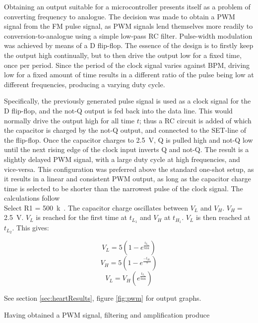 Obtaining an output suitable for a microcontroller presents itself as a problem of converting frequency to analogue. The decision was made to obtain a PWM signal from the FM pulse signal, as PWM signals lend themselves more readily to conversion-to-analogue using a simple low-pass RC filter. Pulse-width modulation was achieved by means of a D flip-flop. The essence of the design is to firstly keep the output high continually, but to then drive the output low for a fixed time, once per period. Since the period of the clock signal varies against BPM, driving low for a fixed amount of time results in a different ratio of the pulse being low at different frequencies, producing a varying duty cycle.

Specifically, the previously generated pulse signal is used as a clock signal for the D flip-flop, and the not-Q output is fed back into the data line. This would normally drive the output high for all time $t$; thus a RC circuit is added of which the capacitor is charged by the not-Q output, and connected to the SET-line of the flip-flop. Once the capacitor charges to \SI{2.5}{V}, Q is pulled high and not-Q low until the next rising edge of the clock input inverts Q and not-Q. The result is a slightly delayed PWM signal, with a large duty cycle at high frequencies, and vice-versa. This configuration was preferred above the standard one-shot setup, as it results in a linear and consistent PWM output, as long as the capacitor charge time is selected to be shorter than the narrowest pulse of the clock signal. The calculations follow\\

Select R1 = \SI{500}{k\Omega}. The capacitor charge oscillates between $V_L$ and $V_H$. $V_H =$ \SI{2.5}{V}. $V_L$ is reached for the first time at $t_{L_1}$ and $V_H$ at $t_{H_1}$. $V_L$ is then reached at  $t_{L_2}$. This gives:


$$V_L = 5\left(1-e^{\frac{t_{L_1}}{tau}}\right)$$
$$V_H = 5\left(1-e^{\frac{-t_H_1}{\tau}}\right)$$
$$V_L = V_H\left(e^{\frac{t_{L_1}}{tau}}\right)$$

See section \ref{sec:heartResults}, figure \ref{fig:pwm} for output graphs. 

Having obtained a PWM signal, filtering and amplification produce 


















